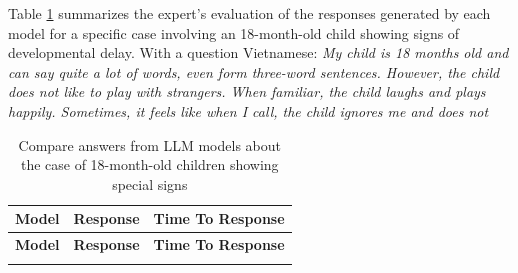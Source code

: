 \documentclass[runningheads]{llncs}
\begin{document}
Table \ref{tab:model-response-comparison} summarizes the expert's evaluation of the responses generated by each model for a specific case involving an 18-month-old child showing signs of developmental delay. With a question Vietnamese: \textit{My child is 18 months old and can say quite a lot of words, even form three-word sentences. However, the child does not like to play with strangers. When familiar, the child laughs and plays happily. Sometimes, it feels like when I call, the child ignores me and does not}
\renewcommand{\arraystretch}{1.4}
\begin{longtable}{|>{\raggedright\arraybackslash}p{3cm}|>{\raggedright\arraybackslash}p{8cm}|>{\centering\arraybackslash}p{1.8cm}|}
\caption{Compare answers from LLM models about the case of 18-month-old children showing special signs}
\label{tab:model-response-comparison} \\
\hline
\textbf{Model} & \textbf{Response} & \textbf{Time To Response} \\
\hline
\endfirsthead

\hline
\textbf{Model} & \textbf{Response} & \textbf{Time To Response} \\
\hline
\endhead

\hline
\endfoot


\end{longtable}
\end{document}
